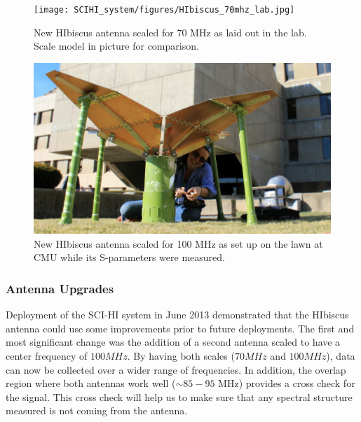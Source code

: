 \begin{figure}[htb]
\begin{center}
\texttt{[image: SCIHI\_system/figures/HIbiscus\_70mhz\_lab.jpg]}
\caption{New HIbiscus antenna scaled for 70 MHz as laid out in the lab. Scale model in picture for comparison.}
\label{Fig:hibiscus_70}
\end{center}
\end{figure}

\begin{figure}[htb]
\begin{center}
\includegraphics[width=0.95\linewidth]{SCIHI_system/figures/HIbiscus_100mhz.jpg}
\caption{New HIbiscus antenna scaled for 100 MHz as set up on the lawn at CMU while its S-parameters were measured. }
\label{Fig:hibiscus_100}
\end{center}
\end{figure}

\subsubsection{Antenna Upgrades} \label{Sec:HIant_upgrade}

Deployment of the SCI-HI system in June 2013 demonstrated that the HIbiscus antenna could use some improvements prior to future deployments. The first and most significant change was the addition of a second antenna scaled to have a center frequency of $100 MHz$. By having both scales ($70 MHz$ and $100 MHz$), data can now be collected over a wider range of frequencies. In addition, the overlap region where both antennas work well ($\sim 85-95$ MHz) provides a cross check for the signal. This cross check will help us to make sure that any spectral structure measured is not coming from the antenna. 

